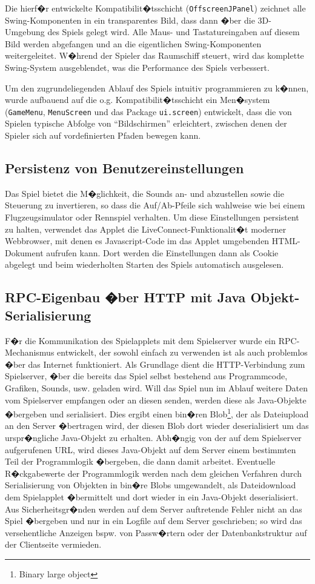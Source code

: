 \documentclass[a4paper,12pt]{scrartcl}
\begin{document}
Die hierf�r entwickelte Kompatibilit�tsschicht (\texttt{OffscreenJPanel})
zeichnet alle Swing-Komponenten in ein transparentes Bild, dass dann �ber die 3D-Umgebung des Spiels
gelegt wird. Alle Maus- und Tastatureingaben auf diesem Bild werden abgefangen und an
die eigentlichen Swing-Komponenten weitergeleitet. W�hrend der Spieler das Raumschiff
steuert, wird das komplette Swing-System ausgeblendet, was die Performance des Spiels
verbessert.

Um den zugrundeliegenden Ablauf des Spiels intuitiv programmieren zu k�nnen, wurde
aufbauend auf die o.g. Kompatibilit�tsschicht ein Men�system (\texttt{GameMenu}, \texttt{MenuScreen} und das Package \texttt{ui.screen}) entwickelt, dass die von Spielen typische
Abfolge von "`Bildschirmen"' erleichtert, zwischen denen der Spieler sich auf vordefinierten Pfaden
bewegen kann.

\subsection{Persistenz von Benutzereinstellungen}
Das Spiel bietet die M�glichkeit, die Sounds an- und abzustellen sowie die Steuerung zu
invertieren, so dass die Auf/Ab-Pfeile sich wahlweise wie bei einem Flugzeugsimulator oder
Rennspiel verhalten. Um diese Einstellungen persistent zu halten, verwendet das Applet die
LiveConnect-Funktionalit�t moderner Webbrowser, mit denen es Javascript-Code im das
Applet umgebenden HTML-Dokument aufrufen kann. Dort werden die Einstellungen dann
als Cookie abgelegt und beim wiederholten Starten des Spiels automatisch ausgelesen.

\subsection{RPC-Eigenbau �ber HTTP mit Java Objekt-Serialisierung}
F�r die Kommunikation des Spielapplets mit dem
Spielserver wurde ein RPC-Mecha\-nismus entwickelt, der
sowohl einfach zu verwenden ist als auch problemlos �ber das Internet funktioniert. Als Grundlage dient die HTTP-Verbindung zum Spielserver, �ber die bereits
das Spiel selbst bestehend aus Programmcode, Grafiken, Sounds, usw. geladen wird.
Will das Spiel nun im Ablauf weitere Daten vom Spielserver empfangen oder an diesen
senden, werden diese als Java-Objekte �bergeben und serialisiert. Dies ergibt einen bin�ren
Blob\footnote{Binary large object}, der als Dateiupload an den Server �bertragen wird, der diesen Blob dort wieder
deserialisiert um das urspr�ngliche Java-Objekt zu erhalten. Abh�ngig von der auf dem
Spielserver aufgerufenen URL, wird dieses Java-Objekt auf dem Server einem bestimmten
Teil der Programmlogik �bergeben, die dann damit arbeitet. Eventuelle
R�ckgabewerte der Programmlogik werden nach dem gleichen Verfahren durch Serialisierung von Objekten
in bin�re Blobs umgewandelt, als Dateidownload dem Spielapplet �bermittelt und dort
wieder in ein Java-Objekt deserialisiert. Aus Sicherheitsgr�nden werden auf dem Server
auftretende Fehler nicht an das Spiel �bergeben und nur in ein Logfile auf dem Server
geschrieben; so wird das versehentliche Anzeigen bspw. von Passw�rtern oder der
Datenbankstruktur auf der Clientseite vermieden.
\end{document}
